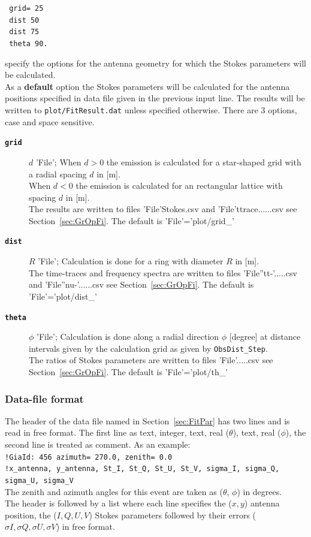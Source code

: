 \documentclass[pdftex,dvipsnames,usenames,fleqn,12pt]{article}
\newcommand*{\secref}[1]{Section~\ref{sec:#1}}
\newcommand*{\seclab}[1]{\label{sec:#1}}
\begin{document}
\begin{linenumbers}\resetlinenumber[21]
\noindent\verb< grid= 25<
\\\verb< dist 50<
\\\verb< dist 75<
\\\verb< theta 90.<
\end{linenumbers}
specify the options for the antenna geometry for which the Stokes parameters will be calculated.
\\As a {\bf default} option the Stokes parameters will be calculated for the antenna positions specified in data file given in the previous input line. The results will be written to \verb<plot/FitResult.dat< unless specified otherwise. There are 3 options, case and space sensitive.
\begin{description}
\item[{\tt\bf grid}] $d$ 'File'; When $d>0$ the emission is calculated for a star-shaped grid with a radial spacing $d$ in [m].
    \\ When $d<0$ the emission is calculated for an rectangular lattice with spacing $d$ in [m].
    \\ The results are written to files 'File'Stokes.csv and 'File'ttrace......csv see \secref{GrOpFi}. The default is 'File'='plot/grid\_'
\item[{\tt\bf dist}] $R$ 'File'; Calculation is done for a ring with diameter $R$ in [m].
    \\ The time-traces and frequency spectra are written to files 'File''tt-'.....csv and 'File''nu-'......csv see \secref{GrOpFi}. The default is 'File'='plot/dist\_'
\item[{\tt\bf theta}] $\phi$ 'File'; Calculation is done along a radial direction $\phi$ [degree] at distance intervals given by the calculation grid as given by \verb<ObsDist_Step<.
    \\ The ratios of Stokes parameters are written to files 'File'.....csv see \secref{GrOpFi}. The default is 'File'='plot/th\_'
\end{description}

\subsubsection{Data-file format}\seclab{DaFiFo}

The header of the data file named in \secref{FitPar} has two lines and is read in free format. The first line as text, integer, text, real ($\theta$), text, real ($\phi$), the second line is treated as comment. As an example:
\\\verb<!GiaId: 456 azimuth= 270.0, zenith= 0.0 <
\\\verb<!x_antenna, y_antenna, St_I, St_Q, St_U, St_V, sigma_I, sigma_Q, sigma_U, sigma_V<
\\The zenith and azimuth angles for this event are taken as ($\theta$, $\phi$) in degrees.
\\The header is followed by a list where each line specifies the ($x, y$) antenna position, the ($I,Q,U,V$) Stokes parameters followed by their errors ($\sigma I,\sigma Q,\sigma U,\sigma V$) in free format.
\end{document}
